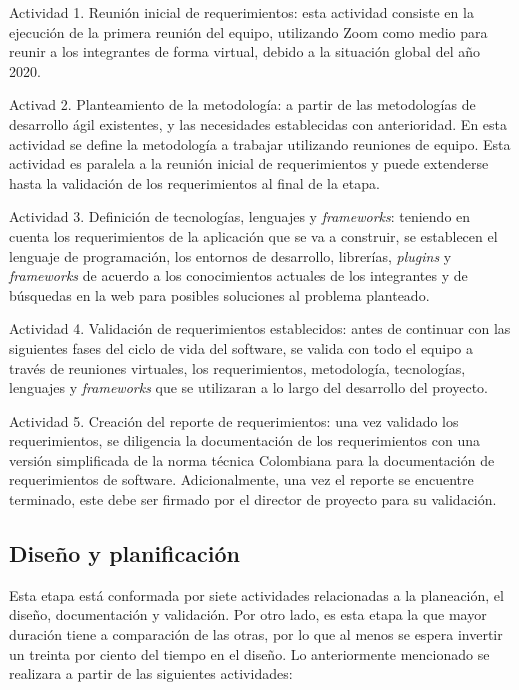 \begin{APAitemize}
    \item Actividad 1. Reunión inicial de requerimientos: esta actividad consiste en la ejecución de la primera reunión del equipo, utilizando Zoom como medio para reunir a los integrantes de forma virtual, debido a la situación global del año 2020.
    \item Activad 2. Planteamiento de la metodología: a partir de las metodologías de desarrollo ágil existentes, y las necesidades establecidas con anterioridad. En esta actividad se define la metodología a trabajar utilizando reuniones de equipo. Esta actividad es paralela a la reunión inicial de requerimientos y puede extenderse hasta la validación de los requerimientos al final de la etapa.
    \item Actividad 3. Definición de tecnologías, lenguajes y \textit{frameworks}: teniendo en cuenta los requerimientos de la aplicación que se va a construir, se establecen el lenguaje de programación, los entornos de desarrollo, librerías, \textit{plugins} y \textit{frameworks} de acuerdo a los conocimientos actuales de los integrantes y de búsquedas en la web para posibles soluciones al problema planteado.
    \item Actividad 4. Validación de requerimientos establecidos: antes de continuar con las siguientes fases del ciclo de vida del software, se valida con todo el equipo a través de reuniones virtuales, los requerimientos, metodología, tecnologías, lenguajes y \textit{frameworks} que se utilizaran a lo largo del desarrollo del proyecto.
    \item Actividad 5. Creación del reporte de requerimientos: una vez validado los requerimientos, se diligencia la documentación de los requerimientos con una versión simplificada de la norma técnica Colombiana para la documentación de requerimientos de software. Adicionalmente, una vez el reporte se encuentre terminado, este debe ser firmado por el director de proyecto para su validación.
\end{APAitemize}

\subsection{Diseño y planificación}
Esta etapa está conformada por siete actividades relacionadas a la planeación, el diseño, documentación y validación. Por otro lado, es esta etapa la que mayor duración tiene a comparación de las otras, por lo que al menos se espera invertir un treinta por ciento del tiempo en el diseño. Lo anteriormente mencionado se realizara a partir de las siguientes actividades:

